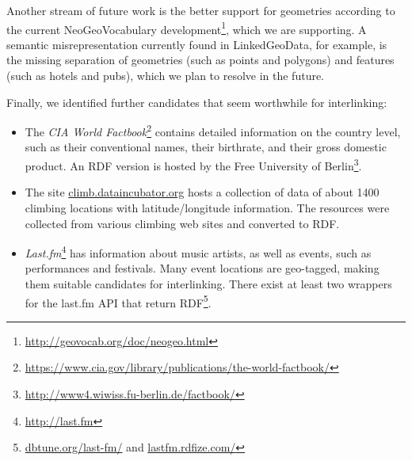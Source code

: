 Another stream of future work is the better support for geometries according to
the current NeoGeoVocabulary
development\footnote{\url{http://geovocab.org/doc/neogeo.html}}, which we are
supporting. A semantic misrepresentation currently found in LinkedGeoData, for
example, is the missing separation of geometries (such as points and polygons)
and features (such as hotels and pubs), which we plan to resolve in the future.

Finally, we identified further candidates that seem worthwhile for interlinking:
\begin{itemize}
\item The \emph{CIA World
Factbook}\footnote{\url{https://www.cia.gov/library/publications/the-world-factbook/}}
contains detailed information on the country level, such as their conventional
names, their birthrate, and their gross domestic product. An RDF version is
hosted by the Free University of
Berlin\footnote{\url{http://www4.wiwiss.fu-berlin.de/factbook/}}.

\item The site \url{climb.dataincubator.org} hosts a collection of data of about
{1400} climbing locations with latitude/longitude information. The resources
were collected from various climbing web sites and converted to RDF.

\item \emph{Last.fm}\footnote{\url{http://last.fm}} has information about music
artists, as well as events, such as performances and festivals. Many event locations are
geo-tagged, making them suitable candidates for interlinking.
There exist at least two wrappers for the {last.fm} API that return
RDF\footnote{\url{dbtune.org/last-fm/} and \url{lastfm.rdfize.com/}}.

\end{itemize}




